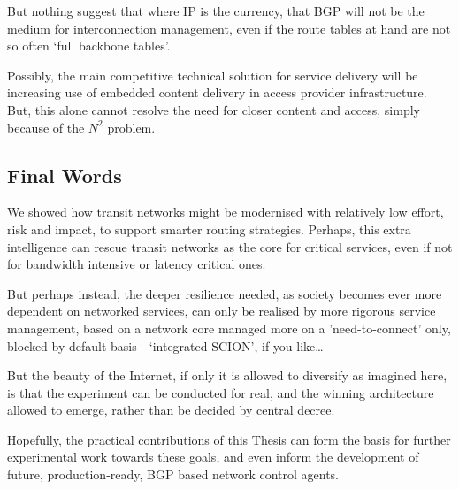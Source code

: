 But nothing suggest that where IP is the currency, that BGP will not be the medium for interconnection management, even if the route tables at hand are not so often `full backbone tables'.


Possibly, the main competitive technical solution for service delivery will be increasing use of embedded content delivery in access provider infrastructure.  But, this alone cannot resolve the need for closer content and access, simply because of the $N^2$ problem.

\subsection{Final Words}

We showed how  transit networks might be modernised with relatively low effort, risk and impact, to support smarter routing strategies. Perhaps, this extra intelligence can rescue transit networks as the core for critical services, even if not for bandwidth intensive or latency critical ones.

But perhaps instead, the deeper resilience needed, as society becomes ever more dependent on networked services, can only be realised by more rigorous service management, based on a network core managed more on a 'need-to-connect' only,  blocked-by-default basis - `integrated-SCION'\cite{zhang2011}, if you like\ldots

But the beauty of the Internet, if only it is allowed to diversify as imagined here, is that the experiment can be conducted for real, and the winning architecture allowed to emerge, rather than be decided by central decree.

Hopefully, the practical contributions of this Thesis can form the basis for further experimental work towards these goals, and even inform the development of future, production-ready, BGP based network control agents.